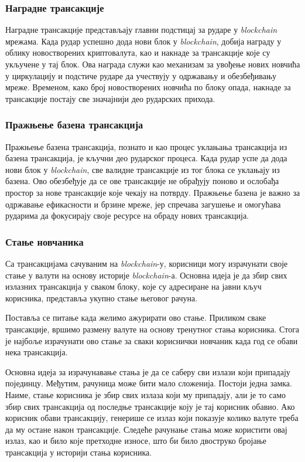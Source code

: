 \documentclass[12pt, a4paper]{article}
\begin{document}
\newpage
\subsubsection{Наградне трансакције}
Наградне трансакције представљају главни подстицај за рударе у \textit{blockchain} мрежама. Када рудар успешно дода нови блок у \textit{blockchain}, добија награду у облику новостворених криптовалута, као и накнаде за трансакције које су укључене у тај блок. Ова награда служи као механизам за увођење нових новчића у циркулацију и подстиче рударе да учествују у одржавању и обезбеђивању мреже. Временом, како број новостворених новчића по блоку опада, накнаде за трансакције постају све значајнији део рударских прихода.

\subsubsection{Пражњење базена трансакција}
Пражњење базена трансакција, познато и као процес уклањања трансакција из базена трансакција, је кључни део рударског процеса. Када рудар успе да дода нови блок у \textit{blockchain}, све валидне трансакције из тог блока се уклањају из базена. Ово обезбеђује да се ове трансакције не обрађују поново и ослобађа простор за нове трансакције које чекају на потврду. Пражњење базена је важно за одржавање ефикасности и брзине мреже, јер спречава загушење и омогућава рударима да фокусирају своје ресурсе на обраду нових трансакција.

\subsubsection{Стање новчаника}
Са трансакцијама сачуваним на \textit{blockchain}-у, корисници могу израчунати своје стање у валути на основу историје \textit{blockchain}-а. Основна идеја је да збир свих излазних трансакција у сваком блоку, које су адресиране на јавни кључ корисника, представља укупно стање његовог рачуна.

Поставља се питање када желимо ажурирати ово стање. Приликом сваке трансакције, вршимо размену валуте на основу тренутног стања корисника. Стога је најбоље израчунати ово стање за сваки кориснички новчаник када год се обави нека трансакција. 

Основна идеја за израчунавање стања је да се саберу сви излази који припадају појединцу. Међутим, рачуница може бити мало сложенија. Постоји једна замка. Наиме, стање корисника је збир свих излаза који му припадају, али је то само збир свих трансакција од последње трансакције коју је тај корисник обавио. Ако корисник обави трансакцију, генерише се излаз који показује колико валуте треба да му остане након трансакције. Следеће рачунање стања може користити овај излаз, као и било које претходне износе, што би било двоструко бројање трансакција у историји стања корисника.
\end{document}

